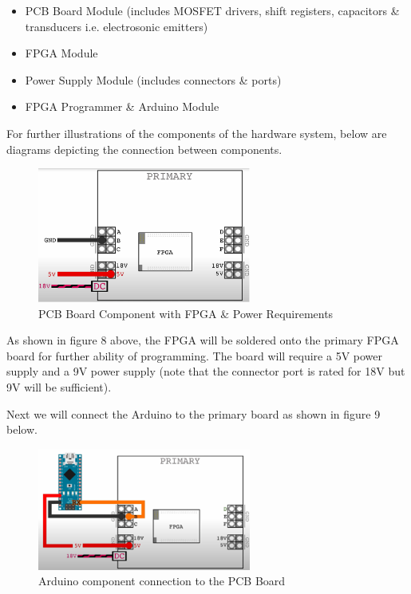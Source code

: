 \documentclass[12pt, titlepage]{article}
\begin{document}
\begin{itemize}
  \item PCB Board Module (includes MOSFET drivers, shift registers,  capacitors \& transducers i.e. electrosonic emitters)
  \item FPGA Module
  \item Power Supply Module (includes connectors \& ports)
  \item FPGA Programmer \& Arduino Module
\end{itemize}

For further illustrations of the components of the hardware system, below are diagrams depicting the connection between components.
\par 

\begin{figure}[htp]
  \centering
  \includegraphics[width=7cm]{images/Figure8.png}
  \caption[PCB and Power]{PCB Board Component with FPGA \& Power Requirements}
  \label{fig:figure8}
\end{figure}

As shown in figure 8 above, the FPGA will be soldered onto the primary FPGA board for further ability of programming. The board will require a 5V power supply and a 9V power supply (note that the connector port is rated for 18V but 9V will be sufficient). 
\par 
Next we will connect the Arduino to the primary board as shown in figure 9 below.
\par

\begin{figure}[htp]
  \centering
  \includegraphics[width=7cm]{images/Figure9.png}
  \caption[Arduino Connectrion]{Arduino component connection to the PCB Board }
  \label{fig:figure9}
\end{figure}
\end{document}
